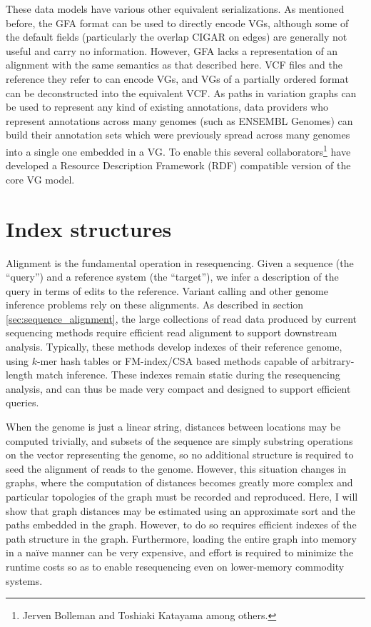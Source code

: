 These data models have various other equivalent serializations.
As mentioned before, the GFA format can be used to directly encode VGs, although some of the default fields (particularly the overlap CIGAR on edges) are generally not useful and carry no information.
However, GFA lacks a representation of an alignment with the same semantics as that described here.
VCF files and the reference they refer to can encode VGs, and VGs of a partially ordered format can be deconstructed into the equivalent VCF.
As paths in variation graphs can be used to represent any kind of existing annotations, data providers who represent annotations across many genomes (such as ENSEMBL Genomes) can build their annotation sets which were previously spread across many genomes into a single one embedded in a VG.
To enable this several collaborators\footnote{Jerven Bolleman and Toshiaki Katayama among others.} have developed a Resource Description Framework (RDF) compatible version of the core VG model.

\section{Index structures}

Alignment is the fundamental operation in resequencing.
Given a sequence (the ``query'') and a reference system (the ``target''), we infer a description of the query in terms of edits to the reference.
Variant calling and other genome inference problems rely on these alignments.
As described in section \ref{sec:sequence_alignment}, the large collections of read data produced by current sequencing methods require efficient read alignment to support downstream analysis.
Typically, these methods develop indexes of their reference genome, using $k$-mer hash tables or FM-index/CSA based methods capable of arbitrary-length match inference.
These indexes remain static during the resequencing analysis, and can thus be made very compact and designed to support efficient queries.

When the genome is just a linear string, distances between locations may be computed trivially, and subsets of the sequence are simply substring operations on the vector representing the genome, so no additional structure is required to seed the alignment of reads to the genome.
However, this situation changes in graphs, where the computation of distances becomes greatly more complex and particular topologies of the graph must be recorded and reproduced.
Here, I will show that graph distances may be estimated using an approximate sort and the paths embedded in the graph.
However, to do so requires efficient indexes of the path structure in the graph.
Furthermore, loading the entire graph into memory in a na\"{i}ve manner can be very expensive, and effort is required to minimize the runtime costs so as to enable resequencing even on lower-memory commodity systems.

